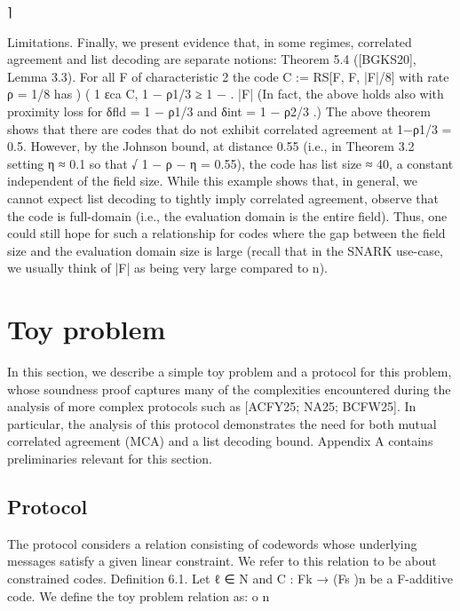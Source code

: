 \documentclass[11pt]{article}
\begin{document}
⌉

Limitations. Finally, we present evidence that, in some regimes, correlated agreement and list
decoding are separate notions:
Theorem 5.4 ([BGKS20], Lemma 3.3). For all F of characteristic 2 the code C := RS[F, F, |F|/8]
with rate ρ = 1/8 has
)
(
1
εca C, 1 − ρ1/3 ≥ 1 −
.
|F|
(In fact, the above holds also with proximity loss for δfld = 1 − ρ1/3 and δint = 1 − ρ2/3 .)
The above theorem shows that there are codes that do not exhibit correlated agreement at 1−ρ1/3 =
0.5. However, by the Johnson bound, at distance 0.55 (i.e., in Theorem 3.2 setting η ≈ 0.1 so that
√
1 − ρ − η = 0.55), the code has list size ≈ 40, a constant independent of the field size.
While this example shows that, in general, we cannot expect list decoding to tightly imply
correlated agreement, observe that the code is full-domain (i.e., the evaluation domain is the entire
field). Thus, one could still hope for such a relationship for codes where the gap between the field
size and the evaluation domain size is large (recall that in the SNARK use-case, we usually think
of |F| as being very large compared to n).


\section{Toy problem}



In this section, we describe a simple toy problem and a protocol for this problem, whose soundness
proof captures many of the complexities encountered during the analysis of more complex protocols
such as [ACFY25; NA25; BCFW25]. In particular, the analysis of this protocol demonstrates the
need for both mutual correlated agreement (MCA) and a list decoding bound. Appendix A contains
preliminaries relevant for this section.


\subsection{Protocol}



The protocol considers a relation consisting of codewords whose underlying messages satisfy a given
linear constraint. We refer to this relation to be about constrained codes.
Definition 6.1. Let ℓ ∈ N and C : Fk → (Fs )n be a F-additive code. We define the toy problem
relation as:
o
n
\end{document}
